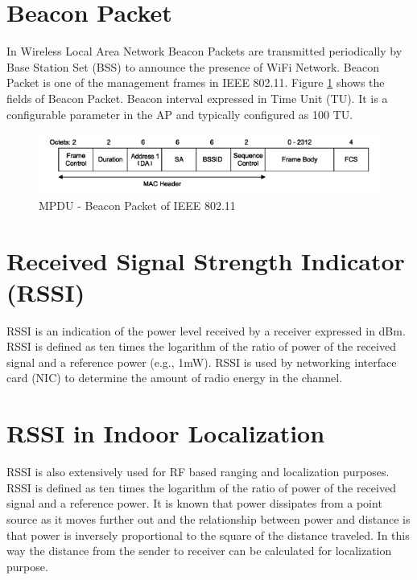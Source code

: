 \documentclass[11pt,a4paper,headinclude,footinclude,chapterprefix=on]{scrreprt}
\begin{document}
\section{Beacon Packet} In Wireless Local Area Network Beacon Packets are transmitted periodically by Base Station Set (BSS) to announce the presence of WiFi Network. Beacon Packet is one of the management frames in IEEE 802.11. Figure \ref{fig:beacon} shows the fields of Beacon Packet. Beacon interval expressed in Time Unit (TU). It is a configurable parameter in the AP and typically configured as 100 TU. 
\begin{figure}
	[!h] \centering 
	\includegraphics[width=15cm]{Images/beacon_frame.png} \caption{MPDU - Beacon Packet of IEEE 802.11} \label{fig:beacon} 
\end{figure}

\section{Received Signal Strength Indicator (RSSI)} RSSI is an indication of the power level received by a receiver expressed in dBm. RSSI is defined as ten times the logarithm of the ratio of power of the received signal and a reference power (e.g., 1mW). RSSI is used by networking interface card (NIC) to determine the amount of radio energy in the channel.


\section{RSSI in Indoor Localization} RSSI is also extensively used for RF based ranging and localization purposes. RSSI is defined as ten times the logarithm of the ratio of power of the received signal and a reference power. It is known that power dissipates from a point source as it moves further out and the relationship between power and distance is that power is inversely proportional to the square of the distance traveled. In this way the distance from the sender to receiver can be calculated for localization purpose.
\end{document}
